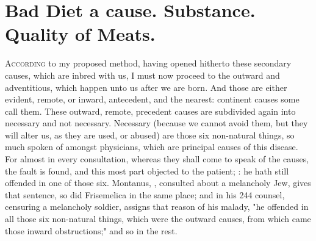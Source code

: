 \section[Bad Diet]{Bad Diet a cause. Substance. Quality of Meats.}\label{sec:bad-diet}

\lettrine{A}{ccording} to my proposed method, having opened hitherto these
secondary causes, which are inbred with us, I must now proceed to the outward
and adventitious, which happen unto us after we are born. And those are either
evident, remote, or inward, antecedent, and the nearest: continent causes some
call them. These outward, remote, precedent causes are subdivided again into
necessary and not necessary. Necessary (because we cannot avoid them, but they
will alter us, as they are used, or abused) are those six non-natural things,
so much spoken of amongst physicians, which are principal causes of this
disease. For almost in every consultation, whereas they shall come to speak of
the causes, the fault is found, and this most part objected to the patient;
: he hath still offended in one of
those six. Montanus, , consulted about a
melancholy Jew, gives that sentence, so did Frisemelica in the same place; and
in his 244 counsel, censuring a melancholy soldier, assigns that reason of his
malady, "he offended in all those six non-natural things,
which were the outward causes, from which came those inward obstructions;" and
so in the rest.

